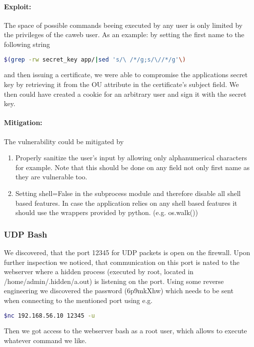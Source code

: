 \documentclass[english]{article}
\begin{document}
\paragraph{Exploit:}
The space of possible commands beeing executed by any user is only limited by the privileges of the caweb user. As an example: by setting the first name to the following string 
\begin{lstlisting}[language=bash]
$(grep -rw secret_key app/|sed 's/\ /*/g;s/\//*/g'\)
\end{lstlisting}
and then issuing a certificate, we were able to compromise the applications secret key by retrieving it from the OU attribute in the certificate's subject field. We then could have created a cookie for an arbitrary user and sign it with the secret key. 

\paragraph{Mitigation:} The vulnerability could be mitigated by
\begin{enumerate}
\item Properly sanitize the user's input by allowing only alphanumerical characters for example. Note that this should be done on any field not only first name as they are vulnerable too. 
\item Setting shell=False in the subprocess module and therefore disable all shell based features. In case the application relies on any shell based features it should use the wrappers provided by python. (e.g. os.walk())
\end{enumerate}

\subsubsection{UDP Bash}
We discovered, that the port 12345 for UDP packets is open on the firewall. Upon further inspection we noticed, that communication on this port is nated to the webserver where a hidden process (executed by root, located in /home/admin/.hidden/a.out) is listening on the port. Using some reverse engineering we discovered the password (6p9mkXhw) which needs to be sent when connecting to the mentioned port using e.g.
\begin{lstlisting}[language=bash]
$nc 192.168.56.10 12345 -u
\end{lstlisting}

Then we got access to the webserver bash as a root user, which allows to execute whatever command we like.
\end{document}
